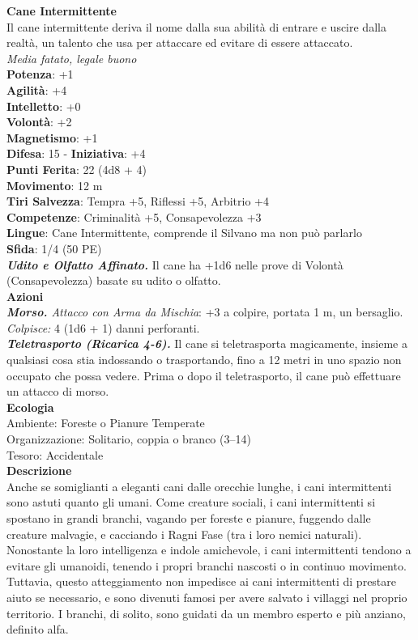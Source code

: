 \begin{multicols}{2}
\medskip\textbf{Cane Intermittente}\\
Il cane intermittente deriva il nome dalla sua abilità di entrare e uscire dalla realtà, un talento che usa per attaccare ed evitare di essere attaccato. \\
\emph{Media fatato, legale buono}\\
\textbf{Potenza}: +1\\
\textbf{Agilità}: +4\\
\textbf{Intelletto}: +0\\
\textbf{Volontà}: +2\\
\textbf{Magnetismo}: +1\\
\textbf{Difesa}: 15 - \textbf{Iniziativa}: +4\\
\textbf{Punti Ferita}: 22 (4d8 + 4)\\
\textbf{Movimento}: 12 m\\
\textbf{Tiri Salvezza}:  Tempra +5, Riflessi +5, Arbitrio +4 \\
\textbf{Competenze}: Criminalità +5, Consapevolezza +3\\
\textbf{Lingue}: Cane Intermittente, comprende il Silvano ma non può parlarlo\\
\textbf{Sfida}: 1/4 (50 PE)\smallskip\\
\emph{\textbf{Udito e Olfatto Affinato.}} Il cane ha +1d6 nelle prove di Volontà (Consapevolezza) basate su udito o olfatto.\\
\smallskip\textbf{Azioni}\\
\emph{\textbf{Morso.} Attacco con Arma da Mischia}: +3 a colpire, portata 1 m, un bersaglio.\\
\emph{Colpisce:} 4 (1d6 + 1) danni perforanti.\\
\emph{\textbf{Teletrasporto (Ricarica 4-6).}} Il cane si teletrasporta magicamente, insieme a qualsiasi cosa stia indossando o trasportando, fino a 12 metri in uno spazio non occupato che possa vedere. Prima o dopo il teletrasporto, il cane può effettuare un attacco di morso.\\
\textbf{Ecologia}\\
Ambiente: Foreste o Pianure Temperate\\
Organizzazione: Solitario, coppia o branco (3–14)\\
Tesoro: Accidentale\\
\textbf{Descrizione}\\

Anche se somiglianti a eleganti cani dalle orecchie lunghe, i cani intermittenti sono astuti quanto gli umani. Come creature sociali, i cani intermittenti si spostano in grandi branchi, vagando per foreste e pianure, fuggendo dalle creature malvagie, e cacciando i Ragni Fase (tra i loro nemici naturali). Nonostante la loro intelligenza e indole amichevole, i cani intermittenti tendono a evitare gli umanoidi, tenendo i propri branchi nascosti o in continuo movimento. Tuttavia, questo atteggiamento non impedisce ai cani intermittenti di prestare aiuto se necessario, e sono divenuti famosi per avere salvato i villaggi nel proprio territorio. I branchi, di solito, sono guidati da un membro esperto e più anziano, definito alfa.\\


\end{multicols}
